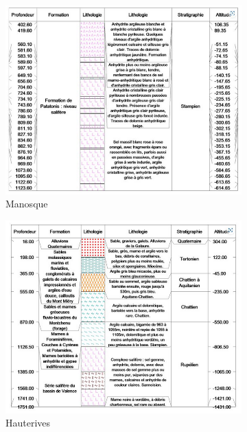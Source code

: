 \documentclass[11pt,french,a4paper]{article}
\begin{document}
\begin{figure}
\begin{subfigure}[b]{0.48\textwidth}
         \centering
         \includegraphics[width=\textwidth]{image/annexe/chap4/salines/manosque.png}
         \caption{Manosque}
     \end{subfigure}
     \begin{subfigure}[b]{0.48\textwidth}
         \centering
         \includegraphics[width=\textwidth]{image/annexe/chap4/salines/hauterives.png}
         \caption{Hauterives}
     \end{subfigure}
     \begin{subfigure}[b]{0.48\textwidth}
         \centering

\end{subfigure}
\end{figure}
\end{document}
